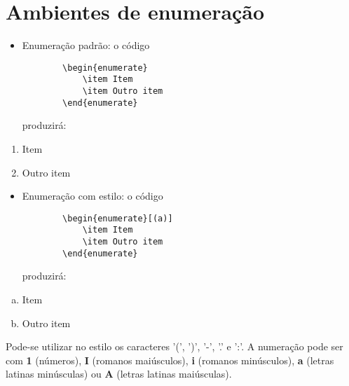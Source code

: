 

\newcommand{\com}[1]{\textbf{\backslash#1}}
\newcommand{\comp}[2]{\textbf{\backslash#1\{#2\}}}
\newcommand{\compp}[3]{\textbf{\backslash#1\{#2\}\{#3\}}}
\newcommand{\comop}[3]{\textbf{\backslash#1[#2]\{#3\}}}

\section{Ambientes de enumeração}

\begin{itemize}
    \item Enumeração padrão: o código
    \begin{verbatim}
        \begin{enumerate}
            \item Item
            \item Outro item
        \end{enumerate}\end{verbatim}
    produzirá:
\end{itemize}
    \begin{enumerate}
        \item Item
        \item Outro item
    \end{enumerate}

\begin{itemize}
    \item Enumeração com estilo: o código
    \begin{verbatim}
        \begin{enumerate}[(a)]
            \item Item
            \item Outro item
        \end{enumerate}\end{verbatim}
    produzirá:
\end{itemize}
    \begin{enumerate}[(a)]
        \item Item
        \item Outro item
    \end{enumerate}
    Pode-se utilizar no estilo os caracteres '(', ')', '-', '.' e ':'. A numeração pode ser com \textbf{1} (números), \textbf{I} (romanos maiúsculos), \textbf{i} (romanos minúsculos), \textbf{a} (letras latinas minúsculas) ou \textbf{A} (letras latinas maiúsculas).

